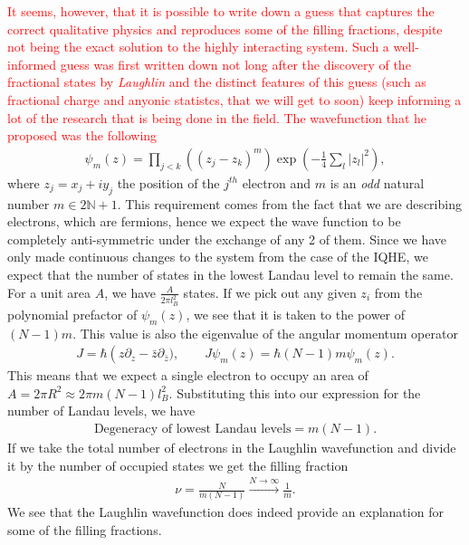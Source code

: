  \textcolor{red}{It seems, however, that it is possible to write down a guess that captures the correct qualitative physics and reproduces some of the filling fractions, despite not being the exact solution to the highly interacting system. Such a well-informed guess was first written down not long after the discovery of the fractional states by \textit{Laughlin} \cite{Laughlin:1983fy} and the distinct features of this guess (such as fractional charge and anyonic statistcs, that we will get to soon) keep informing a lot of the research that is being done in the field. The wavefunction that he proposed was the following }
\begin{align}
    \psi_m(z)= \prod_{j<k} \left((z_j -z_k)^m \right) \exp\left(- \frac{1}{4}\sum\limits_{l}|z_l|^2\right),
\end{align}
where $z_j= x_j+iy_j$ the position of the $j^{th}$ electron and $m$ is an \textit{odd} natural number $m \in 2\mathbb{N}+1$. This requirement comes from the fact that we are describing electrons, which are fermions, hence we expect the wave function to be completely anti-symmetric under the exchange of any 2 of them. Since we have only made continuous changes to the system from the case of the IQHE, we expect that the number of states in the lowest Landau level to remain the same. For a unit area $A$, we have $\frac{A}{2\pi l_B^2}$ states. If we pick out any given $z_i$ from the polynomial prefactor of $\psi_m(z)$, we see that it is taken to the power of $(N-1)m$. This value is also the eigenvalue of the angular momentum operator
\begin{align}
    J = \hbar \left(z \partial_z -\bar{z} \partial_{\bar{z}}), \qquad J\psi_m(z) = \hbar (N-1)m \psi_m(z).
\end{align}
This means that we expect a single electron to occupy an area of $A= 2\pi R^2 \approx 2\pi m (N-1)l_B^2$. Substituting this into our expression for the number of Landau levels, we have
\begin{align}
    \text{Degeneracy of lowest Landau levels} = m(N-1). 
\end{align}
If we take the total number of electrons in the Laughlin wavefunction and divide it by the number of occupied states we get the filling fraction
\begin{align}
    \nu = \frac{N}{m (N-1)} \xrightarrow{N \rightarrow \infty} \frac{1}{m}.
\end{align}
We see that the Laughlin wavefunction does indeed provide an explanation for some of the filling fractions. 

